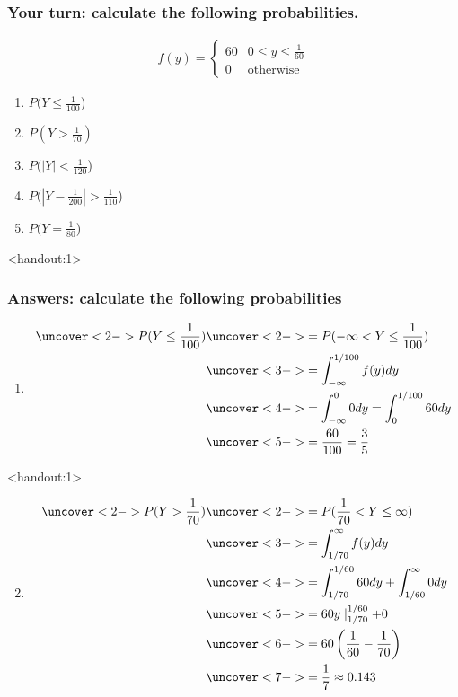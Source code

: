 \documentclass[handout]{beamer}\usepackage[]{graphicx}\usepackage[]{color}
\newcommand{\answers}{1}
\numberwithin{equation}{section}
\begin{document}
\begin{frame}
\frametitle{Your turn: calculate the following probabilities.}
\begin{align*}
f(y) = \begin{cases}
60 & 0 \le y \le \frac{1}{60} \\
0 & \text{otherwise}
\end{cases}
\end{align*}

\begin{enumerate}[1. ]
\item $P(Y \le \frac{1}{100}$)
\item $P(Y > \frac{1}{70})$
\item $P(|Y| < \frac{1}{120}$)
\item $P(\left |Y - \frac{1}{200} \right | > \frac{1}{110}$)
\item $P(Y = \frac{1}{80}$)
\end{enumerate}
\end{frame}






\begin{frame}<handout:\answers>
\frametitle{Answers: calculate the following probabilities} \small
\begin{enumerate}[1. ]
\item 
\begin{align*}
\uncover<2->{ P(Y \le \frac{1}{100})} &\uncover<2->{  = P(-\infty < Y \le \frac{1}{100})} \\
&\uncover<3->{  = \int_{-\infty}^{1/100} f(y) dy} \\
& \uncover<4->{ = \int_{-\infty}^0 0 dy = \int_{0}^{1/100} 60 dy} \\
& \uncover<5->{ = \frac{60}{100} = \frac{3}{5}}
\end{align*}
\end{enumerate}
\end{frame}




\begin{frame}<handout:\answers>
\begin{enumerate}[1. ]
\setcounter{enumi}{1}
\item 
\begin{align*}
\uncover<2->{ P( Y > \frac{1}{70})} & \uncover<2->{ = P(\frac{1}{70} < Y \le \infty)} \\
&\uncover<3->{ = \int_{1/70}^\infty f(y) dy} \\
&\uncover<4->{ = \int_{1/70}^{1/60} 60 dy + \int_{1/60}^\infty 0 dy} \\
&\uncover<5->{ = 60y \mid_{1/70}^{1/60} + 0} \\
&\uncover<6->{ = 60 \left (\frac{1}{60} - \frac{1}{70} \right )} \\
&\uncover<7->{ = \frac{1}{7} \approx 0.143}
\end{align*}
\end{enumerate}
\end{frame}
\end{document}
